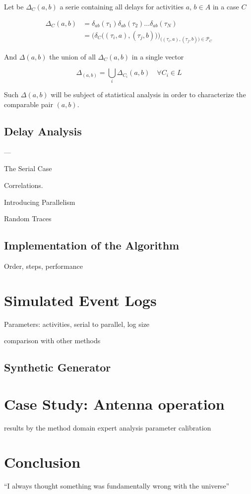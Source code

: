 \documentclass{article}
\begin{document}
Let be $\Delta_C(a, b)$ a serie containing all delays for activities $a$, $b \in A$ in a case $C$

\begin{equation}
\begin{split}
    \Delta_C(a, b) & = \delta_{ab}(\tau_1) \delta_{ab}(\tau_2) \dots \delta_{ab}(\tau_N) \\
                   & = \Big( \delta_C\big( (\tau_i,a), (\tau_j, b) \big) \Big)_{\big( (\tau_i,a), (\tau_j, b) \big) \in \mathcal{P}_C}
\end{split}
\end{equation}

And $\Delta(a, b)$ the union of all $\Delta_C(a, b)$ in a single vector

\begin{equation} \label{eq:all_delays}
    \Delta_(a, b) = \bigcup_{i} \Delta_{C_i}(a, b) \quad \forall C_i \in L
\end{equation}

Such $\Delta(a, b)$ will be subject of statistical analysis in order to characterize the comparable pair $(a,b)$.


\subsection{Delay Analysis}


---

The Serial Case

Correlations. 

Introducing Parallelism

Random Traces

\subsection{Implementation of the Algorithm}

Order, steps, performance


\section{Simulated Event Logs}

Parameters: activities, serial to parallel, log size

comparison with other methods

\subsection{Synthetic Generator}



\section{Case Study: Antenna operation}

results by the method
domain expert analysis
parameter calibration

\section{Conclusion}

``I always thought something was fundamentally wrong with the universe'' \citep{adams1995hitchhiker}




\end{document}
